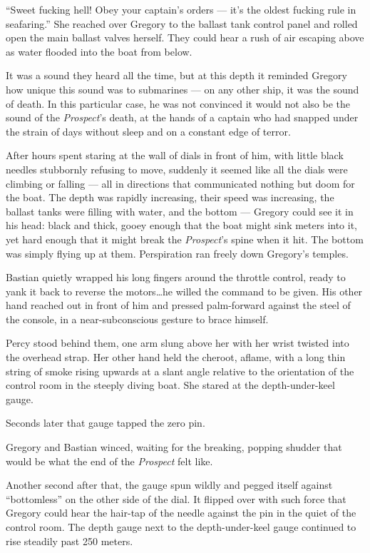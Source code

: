 \documentclass[
]{scrbook}
\begin{document}
``Sweet fucking hell! Obey your captain's orders --- it's the oldest
fucking rule in seafaring.'' She reached over Gregory to the ballast
tank control panel and rolled open the main ballast valves herself. They
could hear a rush of air escaping above as water flooded into the boat
from below.

It was a sound they heard all the time, but at this depth it reminded
Gregory how unique this sound was to submarines --- on any other ship,
it was the sound of death. In this particular case, he was not convinced
it would not also be the sound of the \emph{Prospect}'s death, at the
hands of a captain who had snapped under the strain of days without
sleep and on a constant edge of terror.

After hours spent staring at the wall of dials in front of him, with
little black needles stubbornly refusing to move, suddenly it seemed
like all the dials were climbing or falling --- all in directions that
communicated nothing but doom for the boat. The depth was rapidly
increasing, their speed was increasing, the ballast tanks were filling
with water, and the bottom --- Gregory could see it in his head: black
and thick, gooey enough that the boat might sink meters into it, yet
hard enough that it might break the \emph{Prospect}'s spine when it hit.
The bottom was simply flying up at them. Perspiration ran freely down
Gregory's temples.

Bastian quietly wrapped his long fingers around the throttle control,
ready to yank it back to reverse the motors\ldots he willed the command
to be given. His other hand reached out in front of him and pressed
palm-forward against the steel of the console, in a near-subconscious
gesture to brace himself.

Percy stood behind them, one arm slung above her with her wrist twisted
into the overhead strap. Her other hand held the cheroot, aflame, with a
long thin string of smoke rising upwards at a slant angle relative to
the orientation of the control room in the steeply diving boat. She
stared at the depth-under-keel gauge.

Seconds later that gauge tapped the zero pin.

Gregory and Bastian winced, waiting for the breaking, popping shudder
that would be what the end of the \emph{Prospect} felt like.

Another second after that, the gauge spun wildly and pegged itself
against ``bottomless'' on the other side of the dial. It flipped over
with such force that Gregory could hear the hair-tap of the needle
against the pin in the quiet of the control room. The depth gauge next
to the depth-under-keel gauge continued to rise steadily past 250
meters.
\end{document}
